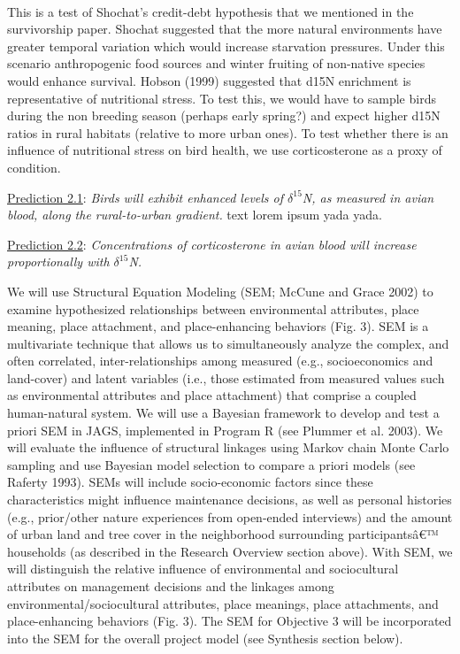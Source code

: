 \documentclass[12pt]{article}
\begin{document}
 \\ 
This is a test of Shochat’s credit-debt hypothesis that we mentioned in the survivorship paper. Shochat suggested that the more natural environments have greater temporal variation which would increase starvation pressures. Under this 
scenario anthropogenic food sources and winter fruiting of non-native species would enhance survival. Hobson (1999) suggested that d15N enrichment is representative of nutritional stress. To test this, we would have to sample birds 
during the non breeding season (perhaps early spring?) and expect higher d15N ratios in rural habitats (relative to more urban ones). To test whether there is an influence of nutritional stress on bird health, we use corticosterone as a 
proxy of condition. \par

\noindent \underline{Prediction 2.1}: \textit{Birds will exhibit enhanced levels of $\delta^{15}$N, as measured in avian blood, along the rural-to-urban gradient.} 
text lorem ipsum yada yada. \par

\noindent \underline{Prediction 2.2}: \textit{Concentrations of corticosterone in avian blood will increase proportionally with $\delta^{15}$N.} \par \par


We will use Structural Equation Modeling (SEM; McCune and Grace 2002) to examine hypothesized relationships between environmental attributes, place meaning, place attachment, and place-enhancing behaviors (Fig. 3). SEM is a multivariate 
technique that allows us to simultaneously analyze the complex, and often correlated, inter-relationships among measured (e.g., socioeconomics and land-cover) and latent variables (i.e., those estimated from measured values such as 
environmental attributes and place attachment) that comprise a coupled human-natural system. We will use a Bayesian framework to develop and test a priori SEM in JAGS, implemented in Program R (see Plummer et al. 2003). We will evaluate 
the influence of structural linkages using Markov chain Monte Carlo sampling and use Bayesian model selection to compare a priori models (see Raferty 1993). SEMs will include socio-economic factors since these characteristics might 
influence maintenance decisions, as well as personal histories (e.g., prior/other nature experiences from open-ended interviews) and the amount of urban land and tree cover in the neighborhood surrounding participantsâ€™ households (as 
described in the Research Overview section above). With SEM, we will distinguish the relative influence of environmental and sociocultural attributes on management decisions and the linkages among environmental/sociocultural attributes, 
place meanings, place attachments, and place-enhancing behaviors (Fig. 3). The SEM for Objective 3 will be incorporated into the SEM for the overall project model (see Synthesis section below).
\end{document}
